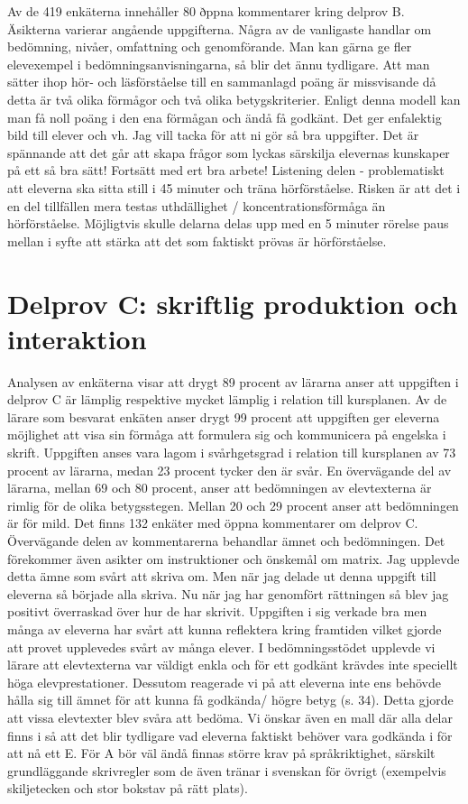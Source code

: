 Av de 419 enkäterna innehåller 80 ðppna kommentarer kring delprov B. Äsikterna varierar angående uppgifterna. Några av de vanligaste handlar om bedömning, nivåer, omfattning och genomförande.
Man kan gärna ge fler elevexempel i bedömningsanvisningarna, så blir det ännu tydligare.
Att man sätter ihop hör- och läsförståelse till en sammanlagd poäng är missvisande då detta är två olika förmågor och två olika betygskriterier. Enligt denna modell kan man få noll poäng i den ena förmågan och ändå få godkänt. Det ger enfalektig bild till elever och vh.
Jag vill tacka för att ni gör så bra uppgifter. Det är spännande att det går att skapa frågor som lyckas särskilja elevernas kunskaper på ett så bra sätt! Fortsätt med ert bra arbete!
Listening delen - problematiskt att eleverna ska sitta still i 45 minuter och träna hörförståelse. Risken är att det i en del tillfällen mera testas uthdällighet / koncentrationsförmåga än hörförståelse. Möjligtvis skulle delarna delas upp med en 5 minuter rörelse paus mellan i syfte att stärka att det som faktiskt prövas är hörförståelse.
\section*{Delprov C: skriftlig produktion och interaktion}
Analysen av enkäterna visar att drygt 89 procent av lärarna anser att uppgiften i delprov C är lämplig respektive mycket lämplig i relation till kursplanen. Av de lärare som besvarat enkäten anser drygt 99 procent att uppgiften ger eleverna möjlighet att visa sin förmåga att formulera sig och kommunicera på engelska i skrift. Uppgiften anses vara lagom i svårhgetsgrad i relation till kursplanen av 73 procent av lärarna, medan 23 procent tycker den är svår. En övervägande del av lärarna, mellan 69 och 80 procent, anser att bedömningen av elevtexterna är rimlig för de olika betygsstegen. Mellan 20 och 29 procent anser att bedömningen är för mild.
Det finns 132 enkäter med öppna kommentarer om delprov C. Övervägande delen av kommentarerna behandlar ämnet och bedömningen. Det förekommer även asikter om instruktioner och önskemål om matrix.
Jag upplevde detta ämne som svårt att skriva om. Men när jag delade ut denna uppgift till eleverna så började alla skriva. Nu när jag har genomfört rättningen så blev jag positivt överraskad över hur de har skrivit.
Uppgiften i sig verkade bra men många av eleverna har svårt att kunna reflektera kring framtiden vilket gjorde att provet upplevedes svårt av många elever. I bedömningsstödet upplevde vi lärare att elevtexterna var väldigt enkla och för ett godkänt krävdes inte speciellt höga elevprestationer. Dessutom reagerade vi på att eleverna inte ens behövde hålla sig till ämnet för att kunna få godkända/ högre betyg (s. 34). Detta gjorde att vissa elevtexter blev svåra att bedöma. Vi önskar även en mall där alla delar finns i så att det blir tydligare vad eleverna faktiskt behöver vara godkända i för att nå ett E.
För A bör väl ändå finnas större krav på språkriktighet, särskilt grundläggande skrivregler som de även tränar i svenskan för övrigt (exempelvis skiljetecken och stor bokstav på rätt plats).


